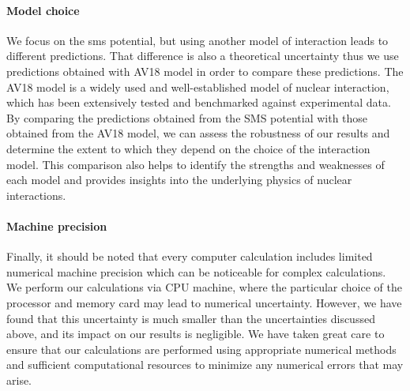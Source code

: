     \paragraph{Model choice}
    We focus on the \gls{sms} potential, but using another model of interaction 
    leads to different predictions. That difference is also a theoretical uncertainty thus
    we use predictions obtained with AV18 model in order to compare these predictions.
    The AV18 model is a widely used and well-established model of nuclear interaction,
    which has been extensively tested and benchmarked against experimental data. By comparing
    the predictions obtained from the SMS potential with those obtained from the AV18 model,
    we can assess the robustness of our results and determine the extent to which they depend
    on the choice of the interaction model. This comparison also helps to identify the strengths
    and weaknesses of each model and provides insights into the underlying physics of nuclear interactions.

    \paragraph{Machine precision}

    Finally, it should be noted that every computer calculation includes limited numerical machine precision which
    can be noticeable for complex calculations. We perform our calculations via CPU machine, where the particular
    choice of the processor and memory card may lead to numerical uncertainty. However, we have found that this
    uncertainty is much smaller than the uncertainties discussed above, and its impact on our results is
    negligible. We have taken great care to ensure that our calculations are performed using appropriate numerical
    methods and sufficient computational resources to minimize any numerical errors that may arise. 
